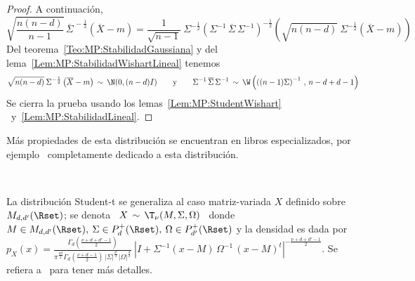 \begin{proof}
  A continuaci\'on,
  \[
  \sqrt{\frac{n   (n-d)}{n-1}}   \,   \overline{\Sigma}^{\,   -\frac12}   \left(
    \overline{X}-m \right)  = \frac{1}{\sqrt{n-1}} \:  \Sigma^{- \frac12} \left(
    \Sigma^{-1}  \, \overline{\Sigma}  \, \Sigma^{-1}  \right)^{-\frac12} \left(
    \sqrt{n (n-d)} \: \Sigma^{-\frac12} \left( \overline{X}-m \right) \right)
  \]
  Del           teorema~\ref{Teo:MP:StabilidadGaussiana}          y          del
  lema~\ref{Lem:MP:StabilidadWishartLineal} tenemos
  \[
  \sqrt{n (n-d)}  \: \Sigma^{-\frac12} \left( \overline{X}-m \right)  \, \sim \,
  \N(0 ,  (n-d) I)  \qquad \mbox{y} \qquad  \Sigma^{-1} \,  \overline{\Sigma} \,
  \Sigma^{-1}  \, \sim  \, \W\left(  \left( (n-1)  \Sigma \right)^{-1}  \,  , \,
    n-d+d-1 \right)
  \]
  Se   cierra   la  prueba   usando   los  lemas~\ref{Lem:MP:StudentWishart}   \
  y~\ref{Lem:MP:StabilidadLineal}.
\end{proof}



M\'as propiedades de esta distribuci\'on se encuentran en libros especializados,
por ejemplo~\cite{KotNad04} completamente dedicado a esta distribuci\'on.

\

La distribuci\'on  Student-t se generaliza  al caso matriz-variada  $X$ definido
sobre $M_{d,d'}(\Rset)$;  se denota \  $X \, \sim \,  \T_\nu(M,\Sigma,\Omega)$ \
donde  \ $M  \in  M_{d,d'}(\Rset), \:  \Sigma  \in P_d^+(\Rset),  \: \Omega  \in
P_{d'}^+(\Rset)$   y  la   densidad  es   dada  por   $\displaystyle   p_X(x)  =
\frac{\Gamma_d\left(      \frac{\nu+d+d'-1}{2}\right)}{\pi^{\frac{\nu     d}{2}}
  \Gamma_d\left(       \frac{\nu+d-1}{2}\right)      \,       \left|      \Sigma
  \right|^{\frac{d'}{2}}  \left|  \Omega \right|^{\frac{d}{2}}}  \:  \left| I  +
  \Sigma^{-1}     (x-M)     \,     \Omega^{-1}     \,     (x-M)^t     \right|^{-
  \frac{\nu+d+d'-1}{2}}$. Se refiera  a~\cite[Cap.~4]{GupNag99} para tener m\'as
detalles.
